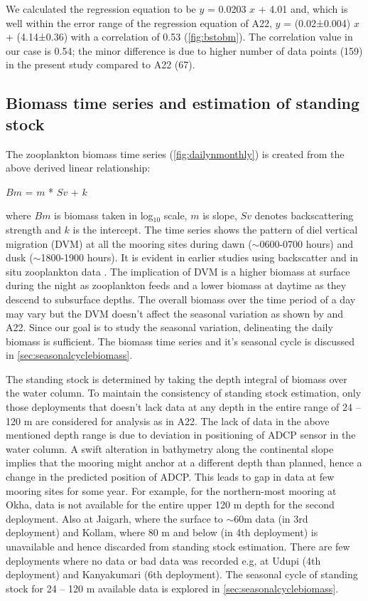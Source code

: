 \documentclass{article}
\begin{document}
	We calculated the regression equation to be $y$ = 0.0203 $x$  + 4.01 and, which is well within the error range of the regression equation of A22, $y$ = (0.02±0.004) $x$ + (4.14±0.36) with a correlation of 0.53 (\cref{fig:bstobm}). The correlation value in our case is 0.54; the minor difference is  due to higher number of data points (159) in the present study compared to A22 (67). 
	
	\subsection{Biomass time series and estimation of standing stock}
	
	The zooplankton biomass time series (\cref{fig:dailynmonthly}) is created from the above derived linear relationship: 
	
	$Bm$ = $m$ * $Sv$ + $k$ 
	
	where $Bm$ is biomass taken in log$_{10}$ scale, $m$ is slope, $Sv$ denotes  backscattering strength and $k$ is the intercept. The time series shows the pattern of diel vertical migration (DVM) at all the mooring sites during dawn ($\sim$0600-0700 hours) and dusk ($\sim$1800-1900 hours). It is evident in earlier studies using backscatter \citep{ashjian2002distribution, smith2005mesozooplankton, inoue2016diel,ursella2018evidence} and in situ zooplankton data \citep{padmavati1998vertical}. The implication of DVM is a higher biomass at surface during the night as zooplankton feeds and a lower biomass at daytime as they descend to subsurface depths. The overall biomass over the time period of a day may vary but the DVM doesn't affect the seasonal variation as shown by \citet{jiang2007temporal} and A22. Since our goal is to study the seasonal variation, delineating the daily biomass is sufficient. The biomass time series and it's seasonal cycle is discussed in \autoref{sec:seasonalcyclebiomass}.
	
	The standing stock is determined by taking the depth integral of biomass over the water column. To maintain the consistency of standing stock estimation, only those deployments that doesn't lack data at any depth in the entire range of 24 -- 120 m are considered for analysis as in A22. The lack of data in the above mentioned depth range is due to deviation in positioning of ADCP sensor in the water column. A swift alteration in bathymetry along the continental slope implies that the mooring might anchor at a different depth than planned, hence a change in the predicted position of ADCP. This leads to gap in data at few mooring sites for some year. For example, for the northern-most mooring at Okha, data is not available for the entire upper 120 m depth for the second deployment. Also at Jaigarh, where the surface to $\sim$60m data (in 3rd deployment) and Kollam, where 80 m and below (in 4th deployment) is unavailable and hence discarded from standing stock estimation. There are few deployments where no data or bad data was recorded e.g, at Udupi (4th deployment) and Kanyakumari (6th deployment). The seasonal cycle of standing stock for 24 -- 120 m available data is explored in \autoref{sec:seasonalcyclebiomass}.
	
\end{document}
